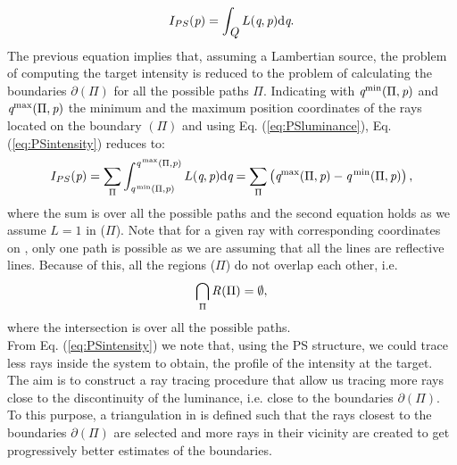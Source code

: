 \begin{equation}
\label{eq:PSintensity}
I_{PS}(\textit{p}) = \int_{\mbox{$\emph{Q}_{\textit{}}$}}L(\textit{q}, \textit{p}) \textrm{d}\textit{q}.
\end{equation}
The previous equation implies that, assuming a Lambertian source, the problem of computing the target intensity is reduced to the problem of calculating the boundaries
$\partial$$(\Pi)$ for all the possible paths $\Pi$. Indicating with $\textit{q}^\textrm{min}(\Pi,\textit{p})$ and $\textit{q}^\textrm{max}(\Pi,\textit{p})$ the minimum and the maximum position coordinates of the rays located on the boundary $(\Pi)$ and using Eq. (\ref{eq:PSluminance}), Eq. (\ref{eq:PSintensity}) reduces to:
\begin{equation}\label{eta2}
I_{PS}(\textit{p}) = \sum_{\Pi}\int_{\textit{q}^\textrm{\,min}(\Pi, \textit{p})}^{\textit{q}^\textrm{\,max}(\Pi,\textit{p})}L(\textit{q}, \textit{p})\textrm{d}\textit{q} = \sum_{\Pi}\big (\textit{q}^\textrm{max}(\Pi,\textit{p})-\textit{q}^\textrm{\,min}(\Pi,\textit{p})\big )\,,
\end{equation}
where the sum is over all the possible paths and the second equation holds as we assume $L=1$ in ($\Pi$).
Note that for a given ray with corresponding coordinates
on , only one path is possible as we are assuming that all the lines are reflective lines.
Because of this, all the regions ($\Pi$) do not overlap each other, i.e.
\begin{equation}
\bigcap_{\Pi}\mbox{$\emph{R}_{\textit{}}$}(\Pi)= \emptyset,
\end{equation}
where the intersection is over all the possible paths. \\ \indent
From Eq. (\ref{eq:PSintensity}) we note that, using the PS structure, we could trace less rays inside the system to obtain, the profile of the intensity at the target.
The aim is to construct a ray tracing procedure that allow us tracing more rays close to the discontinuity of the luminance, i.e. close to the boundaries $\partial$$(\Pi)$.
To this purpose, a triangulation in  is defined such that the rays closest to the boundaries $\partial$$(\Pi)$
are selected and more rays in their vicinity are created to get progressively better estimates of the boundaries.\\ \indent
